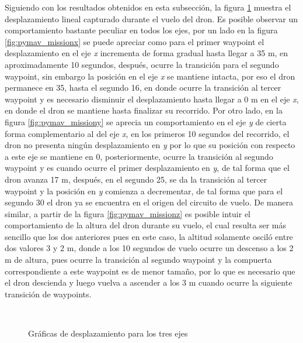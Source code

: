 Siguiendo con los resultados obtenidos en esta subsección, la figura \ref{fig:pymav_missiond} muestra el desplazamiento lineal capturado durante el vuelo del dron. Es posible observar un comportamiento bastante peculiar en todos los ejes, por un lado en la figura \ref{fig:pymav_missionx} se puede apreciar como para el primer waypoint el desplazamiento en el eje \textit{x} incrementa de forma gradual hasta llegar a 35 m, en aproximadamente 10 segundos, después, ocurre la transición para el segundo waypoint, sin embargo la posición en el eje \textit{x} se mantiene intacta, por eso el dron permanece en 35, hasta el segundo 16, en donde ocurre la transición al tercer waypoint y es necesario disminuir el desplazamiento hasta llegar a 0 m en el eje \textit{x}, en donde el dron se mantiene hasta finalizar su recorrido. Por otro lado, en la figura \ref{fig:pymav_missiony} se aprecia un comportamiento en el eje \textit{y} de cierta forma complementario al del eje \textit{x}, en los primeros 10 segundos del recorrido, el dron no presenta ningún desplazamiento en \textit{y} por lo que su posición con respecto a este eje se mantiene en 0, posteriormente, ocurre la transición al segundo waypoint y es cuando ocurre el primer desplazamiento en \textit{y}, de tal forma que el dron avanza 17 m, después, en el segundo 25, se da la transición al tercer waypoint y la posición en \textit{y} comienza a decrementar, de tal forma que para el segundo 30 el dron ya se encuentra en el origen del circuito de vuelo. De manera similar, a partir de la figura \ref{fig:pymav_missionz} es posible intuir el comportamiento de la altura del dron durante su vuelo, el cual resulta ser más sencillo que los dos anteriores pues en este caso, la altitud solamente osciló entre dos valores 3 y 2 m, donde a los 10 segundos de vuelo ocurre un descenso a los 2 m de altura, pues ocurre la transición al segundo waypoint y la compuerta correspondiente  a este waypoint es de menor tamaño, por lo que es necesario que el dron descienda y luego vuelva a ascender a los 3 m cuando ocurre la siguiente transición de waypoints.

\begin{figure}[ht]
    \centering
    \hfill
    \\
    \hfill

    \caption{Gráficas de desplazamiento para los tres ejes}
    \label{fig:pymav_missiond}
\end{figure}

